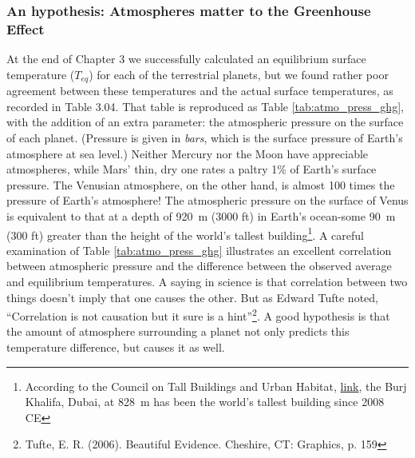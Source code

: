 \subsubsection{An hypothesis: Atmospheres matter to the Greenhouse Effect} 
At the end of Chapter 3 we successfully calculated an equilibrium surface temperature ($T_{eq}$) for each of the terrestrial planets, but we found rather poor agreement between these temperatures and the actual surface temperatures, as recorded in Table 3.04. That table is reproduced as Table \ref{tab:atmo_press_ghg}, with the addition of an extra parameter: the atmospheric pressure on the surface of each planet. (Pressure is given in \textit{bars}, which is the surface pressure of Earth's atmosphere at sea level.) Neither Mercury nor the Moon have appreciable atmospheres, while Mars' thin, dry one rates a paltry 1\% of Earth's surface pressure. The Venusian atmosphere, on the other hand, is almost 100 times the pressure of Earth's atmosphere! The atmospheric pressure on the surface of Venus is equivalent to that at a depth of \SI{920}{\metre} (3000 ft) in Earth's ocean-some \SI{90}{\metre} (300 ft) greater than the height of the world's tallest building\footnote{According to the Council on Tall Buildings and Urban Habitat, \href{http://www.skyscrapercenter.com/}{link}, the Burj Khalifa, Dubai, at \SI{828}{\metre} has been the world's tallest building since 2008 CE}. A careful examination of Table \ref{tab:atmo_press_ghg} illustrates an excellent correlation between atmospheric pressure and the difference between the observed average and equilibrium temperatures. A saying in science is that correlation between two things doesn't imply that one causes the other. But as Edward Tufte noted, ``Correlation is not causation but it sure is a hint''\footnote{Tufte, E. R. (2006). Beautiful Evidence. Cheshire, CT: Graphics, p. 159}. A good hypothesis is that the amount of atmosphere surrounding a planet not only predicts this temperature difference, but causes it as well.\\

